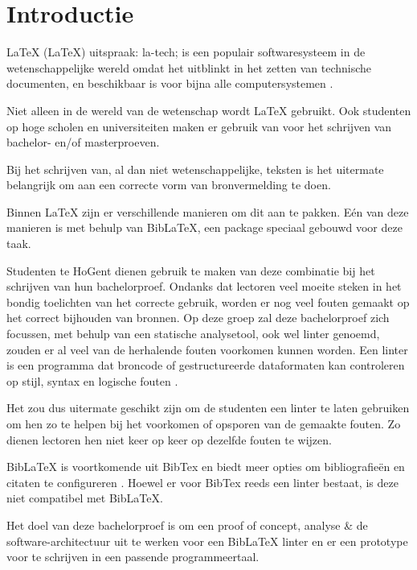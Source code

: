 
\section{Introductie}%
\label{sec:introductie}

LaTeX (\LaTeX) uitspraak: la-tech; is een populair softwaresysteem in de wetenschappelijke wereld omdat het uitblinkt in het zetten van technische documenten,
en beschikbaar is voor bijna alle computersystemen \autocite{Wiki23}.

Niet alleen in de wereld van de wetenschap wordt LaTeX gebruikt. Ook studenten op hoge scholen en universiteiten maken er gebruik van voor het schrijven van bachelor- en/of masterproeven.

Bij het schrijven van, al dan niet wetenschappelijke, teksten is het uitermate belangrijk om aan een correcte vorm van bronvermelding te doen.

Binnen LaTeX zijn er verschillende manieren om dit aan te pakken. Eén van deze manieren is met behulp van BibLaTeX, een package speciaal gebouwd voor deze taak.

Studenten te HoGent dienen gebruik te maken van deze combinatie bij het schrijven van hun bachelorproef. Ondanks dat lectoren veel moeite steken in het bondig toelichten van het correcte gebruik, worden er nog veel fouten gemaakt op het correct bijhouden van bronnen. 
Op deze groep zal deze bachelorproef zich focussen, met behulp van een statische analysetool, ook wel linter genoemd, zouden er al veel van de herhalende fouten voorkomen kunnen worden. Een linter is een programma dat broncode of gestructureerde dataformaten kan controleren op stijl, syntax en logische fouten \autocite{Kamunya2023}.

Het zou dus uitermate geschikt zijn om de studenten een linter te laten gebruiken om hen zo te helpen bij het voorkomen of opsporen van de gemaakte fouten. Zo dienen lectoren hen niet keer op keer op dezelfde fouten te wijzen.

BibLaTeX is voortkomende uit BibTex en biedt meer opties om bibliografieën en citaten te configureren \autocite{Cassidy2013}. Hoewel er voor BibTex reeds een linter bestaat, is deze niet compatibel met BibLaTeX.

Het doel van deze bachelorproef is om een proof of concept, analyse \& de software-architectuur uit te werken voor een BibLaTeX linter en er een prototype voor te schrijven in een passende programmeertaal. 

